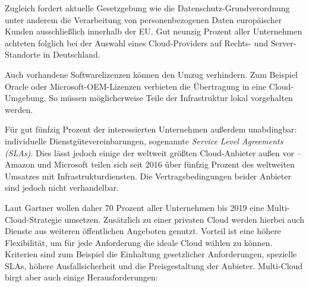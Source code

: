 Zugleich fordert aktuelle Gesetzgebung wie die Datenschutz-Grundverordnung unter anderem die Verarbeitung von personenbezogenen Daten europäischer Kunden ausschließlich innerhalb der EU. %
Gut neunzig Prozent aller Unternehmen achteten folglich bei der Auswahl eines Cloud-Providers auf Rechts- und Server-Standorte in Deutschland. 

Auch vorhandene Softwarelizenzen können den Umzug verhindern. Zum Beispiel Oracle oder Microsoft-OEM-Lizenzen verbieten die Übertragung in eine Cloud-Umgebung. So müssen möglicherweise Teile der Infrastruktur lokal vorgehalten werden.

Für gut fünfzig Prozent der interessierten Unternehmen außerdem unabdingbar: individuelle Dienstgütevereinbarungen, sogenannte \emph{Service Level Agreements (SLAs)}.
Dies lässt jedoch einige der weltweit größten Cloud-Anbieter außen vor -- Amazon und Microsoft teilen sich seit 2016 über fünfzig Prozent des weltweiten Umsatzes mit Infrastrukturdiensten. Die Vertragsbedingungen beider Anbieter sind jedoch nicht verhandelbar. %

Laut Gartner wollen daher 70 Prozent aller Unternehmen bis 2019 eine Multi-Cloud-Strategie umsetzen. Zusätzlich zu einer privaten Cloud werden hierbei auch Dienste aus weiteren öffentlichen Angeboten genutzt. Vorteil ist eine höhere Flexibilität, um für jede Anforderung die ideale Cloud wählen zu können. Kriterien sind zum Beispiel die Einhaltung gesetzlicher Anforderungen, spezielle SLAs, höhere Ausfallsicherheit und die Preisgestaltung der Anbieter. Multi-Cloud birgt aber auch einige Herausforderungen:



%
%
%
%
%

